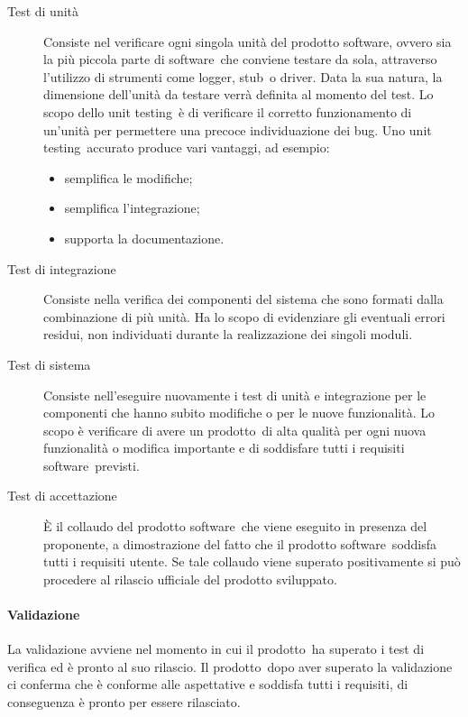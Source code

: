 \documentclass[../PianoDiQualifica.tex]{subfiles}
\begin{document}
					\begin{description}
						\item [Test di unità] Consiste nel verificare ogni singola unità del prodotto software\g, ovvero sia la più piccola parte di software\g\ che conviene testare da sola, attraverso l'utilizzo di strumenti come logger\g, stub\g\ o driver\g. Data la sua natura, la dimensione dell'unità da testare verrà definita al momento del test. Lo scopo dello unit testing\g\ è di verificare il corretto funzionamento di un'unità per permettere una precoce individuazione dei bug\g. Uno unit testing\g\ 
accurato produce vari vantaggi, ad esempio:
						\begin{itemize}
							\item semplifica le modifiche;
							\item semplifica l'integrazione;
							\item supporta la documentazione.
						\end{itemize}
						\item[Test di integrazione] Consiste nella verifica dei componenti del sistema che sono formati dalla combinazione di più unità. Ha lo scopo di evidenziare gli eventuali errori residui, non individuati durante la realizzazione dei singoli moduli.
						\item[Test di sistema] Consiste nell'eseguire nuovamente i test di unità e integrazione per le componenti che hanno subito modifiche o per le nuove funzionalità. Lo scopo è verificare di avere un prodotto\g\ di alta qualità per ogni nuova funzionalità o modifica importante e di soddisfare tutti i requisiti software\g\ previsti.
						\item[Test di accettazione] È il collaudo del prodotto software\g\ che viene eseguito in presenza del proponente, a dimostrazione del fatto che il prodotto 
software\g\ 
soddisfa tutti i requisiti utente. Se tale collaudo viene superato positivamente si può procedere al rilascio ufficiale del prodotto sviluppato. 
					\end{description}
				\paragraph{Validazione}
				La validazione avviene nel momento in cui il prodotto\g\ ha superato i test di verifica ed è pronto al suo rilascio. Il prodotto\g\ 
dopo aver superato la validazione ci conferma che è conforme alle aspettative e soddisfa tutti i requisiti, di conseguenza è pronto per essere rilasciato.
\end{document}
